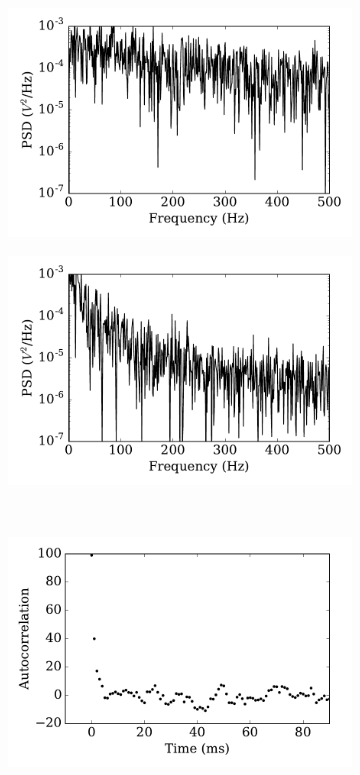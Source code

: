 \begin{figure}[tbp!]
\begin{subfigure}[t]{0.43\textwidth}
			\includegraphics[width=\textwidth]{pics_iconip/psd_tau1.pdf}
			\caption{}
		\end{subfigure}
		\begin{subfigure}[t]{0.43\textwidth}
			\includegraphics[width=\textwidth]{pics_iconip/psd_tau10.pdf}
			\caption{}
		\end{subfigure}\\
		\begin{subfigure}[t]{0.43\textwidth}
			\includegraphics[width=\textwidth]{pics_iconip/autocorr_tau1.pdf}

\end{subfigure}
\end{figure}
